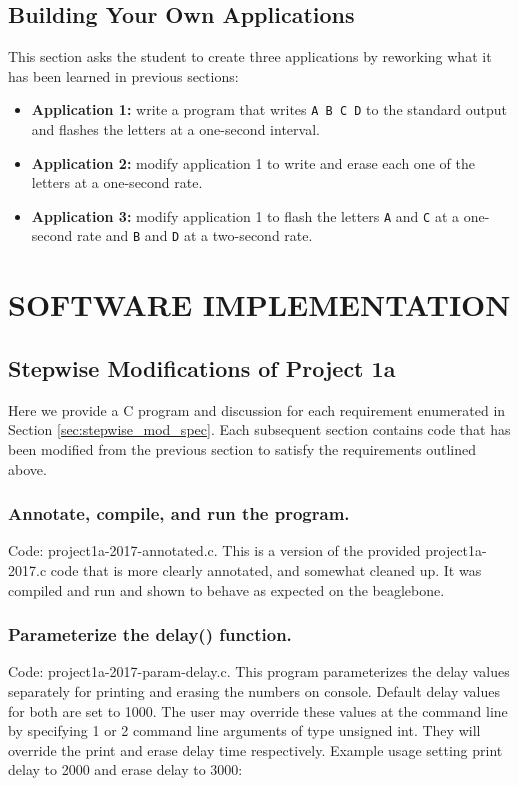 \documentclass[letterpaper, 12pt]{article}
\begin{document}
\subsection{Building Your Own Applications}
This section asks the student to create three applications by reworking what it has been learned in previous sections:

\begin{itemize}
    \item \textbf{Application 1:} write a program that writes \verb+A B C D+ to the standard output and flashes the letters at a one-second interval.
    \item \textbf{Application 2:} modify application 1 to write and erase each one of the letters at a one-second rate.
    \item \textbf{Application 3:} modify application 1 to flash the letters \verb+A+ and \verb+C+ at a one-second rate and \verb+B+ and \verb+D+ at a two-second rate.
\end{itemize}


\section{SOFTWARE IMPLEMENTATION}
\label{sec:implementation}

\subsection{Stepwise Modifications of Project 1a}
Here we provide a C program and discussion for each requirement enumerated in
Section \ref{sec:stepwise_mod_spec}.  Each subsequent section contains code that has been modified from the previous section to satisfy the requirements outlined above.
\subsubsection{Annotate, compile, and run the program.}
Code: project1a-2017-annotated.c.  This is a version of the provided project1a-2017.c code that is more clearly annotated, and somewhat cleaned up.  It was compiled and run and shown to behave as expected on the beaglebone.
\subsubsection{Parameterize the delay() function.}
Code: project1a-2017-param-delay.c.  This program parameterizes the delay values separately for printing and erasing the numbers on console.  Default delay values for both are set to 1000.  The user may override these values at the command line by specifying 1 or 2 command line arguments of type unsigned int.  They will override the print and erase delay time respectively.  Example usage setting print delay to 2000 and erase delay to 3000:
\end{document}
